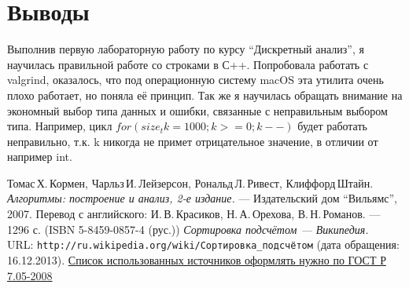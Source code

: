 \documentclass[pdf, unicode, 12pt, a4paper,oneside,fleqn]{article}
\begin{document}
\section{Выводы}
Выполнив первую лабораторную работу по курсу \enquote{Дискретный анализ}, я научилась правильной работе со строками в С++. Попробовала работать с valgrind, оказалось, что под операционную систему macOS эта утилита очень плохо работает, но поняла её принцип. Так же я научилась обращать внимание на экономный выбор типа данных и ошибки, связанные с неправильным выбором типа. Например, цикл $for(size_t k = 1000; k >=0; k--)$ будет работать неправильно, т.к. k никогда не примет отрицательное значение, в отличии от например int.
\pagebreak

\begin{thebibliography}{99}
Томас\,Х.\,Кормен, Чарльз\,И.\,Лейзерсон, Рональд\,Л.\,Ривест, Клиффорд\,Штайн.
{\itshape Алгоритмы: построение и анализ, 2-е издание.} --- Издательский дом \enquote{Вильямс}, 2007. Перевод с английского: И.\,В.\,Красиков, Н.\,А.\,Орехова, В.\,Н.\,Романов. --- 1296 с. (ISBN 5-8459-0857-4 (рус.))
{\itshape Сортировка подсчётом — Википедия.} \\URL: \texttt{http://ru.wikipedia.org/wiki/Сортировка\_подсчётом} (дата обращения: 16.12.2013).
\href{http://www.ifap.ru/library/gost/7052008.pdf}{Список использованных источников оформлять нужно по  ГОСТ Р 7.05-2008}
\end{thebibliography}
\pagebreak
\end{document}
